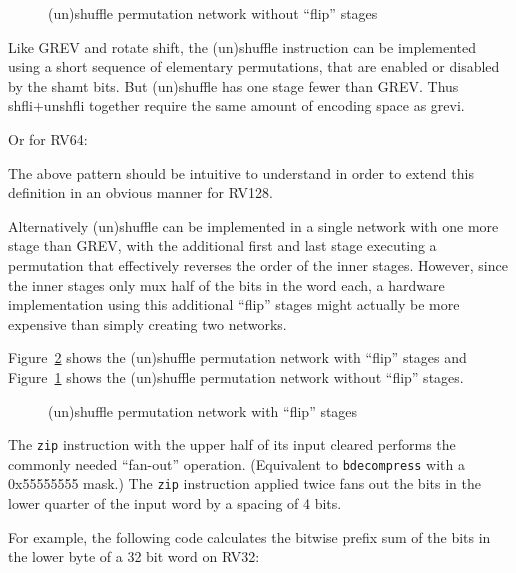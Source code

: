 \begin{figure}[t]
\begin{center}

\end{center}
\caption{(un)shuffle permutation network without ``flip'' stages}
\label{permnet-gzip-noflip}
\end{figure}

Like GREV and rotate shift, the (un)shuffle instruction can be implemented using a short
sequence of elementary permutations, that are enabled or disabled by the shamt
bits. But (un)shuffle has one stage fewer than GREV. Thus shfli+unshfli together require
the same amount of encoding space as grevi.



Or for RV64:



The above pattern should be intuitive to understand in order to extend
this definition in an obvious manner for RV128.

Alternatively (un)shuffle can be implemented in a single network with one more
stage than GREV, with the additional first and last stage executing a
permutation that effectively reverses the order of the inner stages. However,
since the inner stages only mux half of the bits in the word each, a hardware
implementation using this additional ``flip'' stages might actually be more
expensive than simply creating two networks.



Figure~\ref{permnet-gzip-flip} shows the (un)shuffle permutation network with
``flip'' stages and Figure~\ref{permnet-gzip-noflip} shows the (un)shuffle
permutation network without ``flip'' stages.

\begin{figure}[t]
\begin{center}

\end{center}
\caption{(un)shuffle permutation network with ``flip'' stages}
\label{permnet-gzip-flip}
\end{figure}

The \texttt{zip} instruction with the upper half of its input cleared performs
the commonly needed ``fan-out'' operation. (Equivalent to {\tt bdecompress} with a
0x55555555 mask.) The \texttt{zip} instruction applied twice fans out the bits
in the lower quarter of the input word by a spacing of 4 bits.

For example, the following code calculates the bitwise prefix sum of the bits
in the lower byte of a 32 bit word on RV32:

